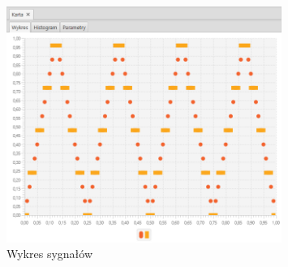 \documentclass[12pt]{article}
\begin{document}
{{{                \begin{figure}[H]
                    \centering
                    \includegraphics[width=0.8\textwidth]{img/result/experiment5/08/data_draw_sampling_output_quant_output_202238.png}
                    \caption{Wykres sygnałów}
                \end{figure}
            }
            \newpage

        }

    }
\end{document}
